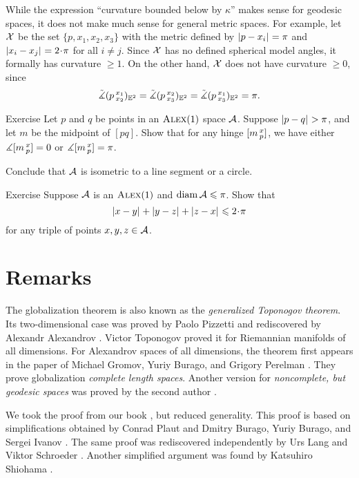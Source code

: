 While the expression ``curvature bounded below by $\kappa$'' makes sense for geodesic spaces,
it does not make much sense for general metric spaces.
For example, let $\mathcal{X}$ be the set $\{p,x_1,x_2,x_3\}$ with the metric defined by
$|{p}-{x_i}|_{}^{{}}=\pi$ and $\dist{x_i}{x_j}{}=2\cdot\pi$ for all $i\ne j$.
Since $\mathcal{X}$ has no defined spherical model angles, it formally has curvature $\ge 1$.
On the other hand, $\mathcal{X}$ does not have curvature $\ge 0$, since
\[
\tilde\measuredangle(p\,{}^{x_1}_{x_2})_{\mathbb{E}^2}
=\tilde\measuredangle(p\,{}^{x_2}_{x_3})_{\mathbb{E}^2}
=\tilde\measuredangle(p\,{}^{x_1}_{x_3})_{\mathbb{E}^2}
=\pi.
\]

\begin{thm}[!]{Exercise}\label{ex:RisCBB(1)}
Let $p$ and $q$ be points in an $\textsc{Alex}(1)$ space $\mathcal{A}$.
Suppose $|{p}-{q}|_{}^{{}}>\pi$, and let $m$ be the midpoint of $[pq]$.
Show that for any hinge $[m\,{}^{x}_{p}]$, we have either
$\measuredangle[m\,{}^{x}_{p}]=0$ or $\measuredangle[m\,{}^{x}_{p}]=\pi$.

Conclude that $\mathcal{A}$ is isometric to a line segment or a circle.
\end{thm}

\begin{thm}{Exercise}\label{ex:perim-k>0}
Suppose  
$\mathcal{A}$ is an $\textsc{Alex}(1)$
and $\operatorname{\rm diam}\nolimits \mathcal{A}\leqslant \pi$.
Show that 
\[\dist{x}{y}{}+\dist{y}{z}{}+\dist{z}{x}{}\le 2\cdot\pi\]
for any triple of points $x,y,z\in \mathcal{A}$.
\end{thm}


\section{Remarks}

The globalization theorem is also known as the \textit{generalized Toponogov theorem}.
Its two-dimensional case was proved by Paolo Pizzetti \cite{pizzetti} and
rediscovered by Alexandr Alexandrov \cite{alexandrov:devel}. %
Victor Toponogov \cite{toponogov-globalization+splitting} proved it for Riemannian manifolds of all dimensions.
For Alexandrov spaces of all dimensions, the theorem first appears in the paper of Michael Gromov, Yuriy Burago, and Grigory Perelman \cite{burago-gromov-perelman}.
They prove globalization \textit{complete length spaces}.
Another version for \textit{noncomplete, but geodesic spaces} was proved by the second author \cite{petrunin:globalization}.


We took the proof from our book \cite{alexander-kapovitch-petrunin2024}, but reduced generality.
This proof is based on simplifications obtained by Conrad Plaut \cite{plaut:dimension} and Dmitry Burago, Yuriy Burago, and Sergei Ivanov \cite{burago-burago-ivanov}.
The same proof was rediscovered independently by Urs Lang and Viktor Schroeder \cite{lang-schroeder:globalization}.
Another simplified argument was found by Katsuhiro Shiohama \cite{shiohama}.




